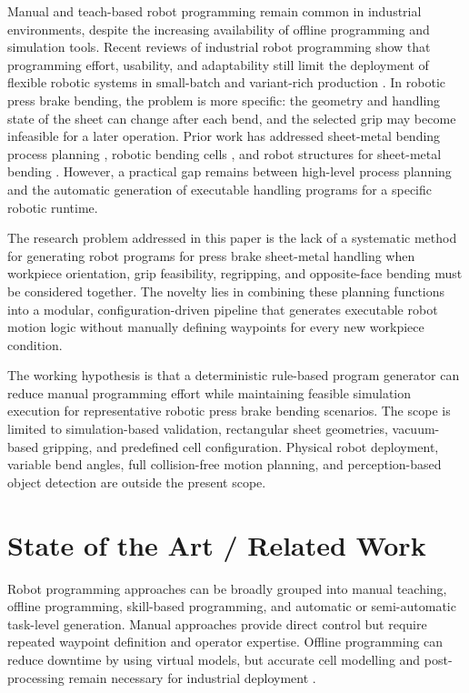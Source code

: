\documentclass[journal]{IEEEtran}
\begin{document}
Manual and teach-based robot programming remain common in industrial environments, despite the increasing availability of offline programming and simulation tools. Recent reviews of industrial robot programming show that programming effort, usability, and adaptability still limit the deployment of flexible robotic systems in small-batch and variant-rich production \cite{Bilancia2023IndustrialRobotProgramming}. In robotic press brake bending, the problem is more specific: the geometry and handling state of the sheet can change after each bend, and the selected grip may become infeasible for a later operation. Prior work has addressed sheet-metal bending process planning \cite{Gupta1998SheetMetalBending}, robotic bending cells \cite{Aomura2002RoboticBending}, and robot structures for sheet-metal bending \cite{Xu2019SheetMetalBendingRobot}. However, a practical gap remains between high-level process planning and the automatic generation of executable handling programs for a specific robotic runtime.

The research problem addressed in this paper is the lack of a systematic method for generating robot programs for press brake sheet-metal handling when workpiece orientation, grip feasibility, regripping, and opposite-face bending must be considered together. The novelty lies in combining these planning functions into a modular, configuration-driven pipeline that generates executable robot motion logic without manually defining waypoints for every new workpiece condition.

The working hypothesis is that a deterministic rule-based program generator can reduce manual programming effort while maintaining feasible simulation execution for representative robotic press brake bending scenarios. The scope is limited to simulation-based validation, rectangular sheet geometries, vacuum-based gripping, and predefined cell configuration. Physical robot deployment, variable bend angles, full collision-free motion planning, and perception-based object detection are outside the present scope.

\section{State of the Art / Related Work}
Robot programming approaches can be broadly grouped into manual teaching, offline programming, skill-based programming, and automatic or semi-automatic task-level generation. Manual approaches provide direct control but require repeated waypoint definition and operator expertise. Offline programming can reduce downtime by using virtual models, but accurate cell modelling and post-processing remain necessary for industrial deployment \cite{Bilancia2023IndustrialRobotProgramming}.
\end{document}
